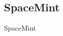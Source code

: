 \subsection{SpaceMint\label{spacemint}}
\begin{otherlanguage}{english}

SpaceMint

\end{otherlanguage}